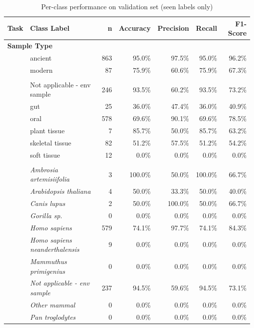 \begin{table}[!p]
\caption{Per-class performance on validation set (seen labels only)\label{tab:perclass_performance}}
\begin{tabular*}{\columnwidth}{@{\extracolsep{\fill}}llrrrrr@{\extracolsep{\fill}}}
\toprule
Task & Class Label & n & Accuracy & Precision & Recall & F1-Score \\
\midrule
\multicolumn{7}{l}{\textbf{Sample Type}} \\
\addlinespace[0.5em]
 & ancient & 863 & 95.0\% & 97.5\% & 95.0\% & 96.2\% \\
 & modern & 87 & 75.9\% & 60.6\% & 75.9\% & 67.3\% \\
\addlinespace
\multicolumn{7}{l}{\textbf{Community Type}} \\
\addlinespace[0.5em]
 & Not applicable - env sample & 246 & 93.5\% & 60.2\% & 93.5\% & 73.2\% \\
 & gut & 25 & 36.0\% & 47.4\% & 36.0\% & 40.9\% \\
 & oral & 578 & 69.6\% & 90.1\% & 69.6\% & 78.5\% \\
 & plant tissue & 7 & 85.7\% & 50.0\% & 85.7\% & 63.2\% \\
 & skeletal tissue & 82 & 51.2\% & 57.5\% & 51.2\% & 54.2\% \\
 & soft tissue & 12 & 0.0\% & 0.0\% & 0.0\% & 0.0\% \\
\addlinespace
\multicolumn{7}{l}{\textbf{Sample Host}} \\
\addlinespace[0.5em]
 & \textit{Ambrosia artemisiifolia} & 3 & 100.0\% & 50.0\% & 100.0\% & 66.7\% \\
 & \textit{Arabidopsis thaliana} & 4 & 50.0\% & 33.3\% & 50.0\% & 40.0\% \\
 & \textit{Canis lupus} & 2 & 50.0\% & 100.0\% & 50.0\% & 66.7\% \\
 & \textit{Gorilla sp.} & 0 & 0.0\% & 0.0\% & 0.0\% & 0.0\% \\
 & \textit{Homo sapiens} & 579 & 74.1\% & 97.7\% & 74.1\% & 84.3\% \\
 & \textit{Homo sapiens neanderthalensis} & 9 & 0.0\% & 0.0\% & 0.0\% & 0.0\% \\
 & \textit{Mammuthus primigenius} & 0 & 0.0\% & 0.0\% & 0.0\% & 0.0\% \\
 & \textit{Not applicable - env sample} & 237 & 94.5\% & 59.6\% & 94.5\% & 73.1\% \\
 & \textit{Other mammal} & 0 & 0.0\% & 0.0\% & 0.0\% & 0.0\% \\
 & \textit{Pan troglodytes} & 0 & 0.0\% & 0.0\% & 0.0\% & 0.0\% \\

\end{tabular*}
\end{table}
